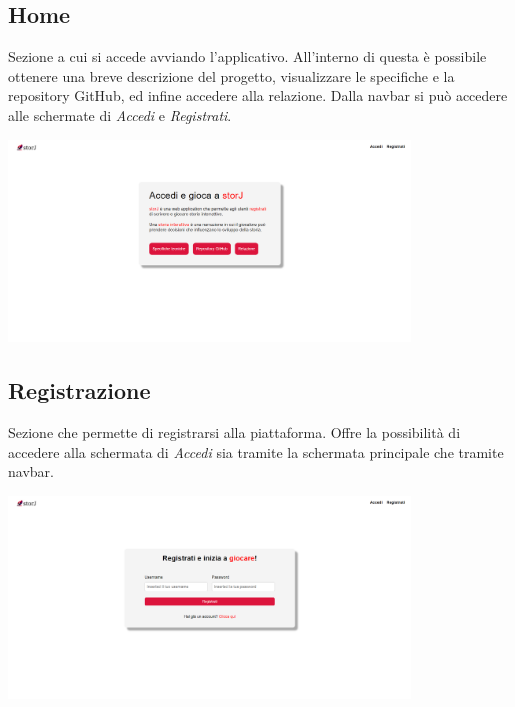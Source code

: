 \documentclass{article}
\begin{document}
\subsection*{Home}
Sezione a cui si accede avviando l'applicativo. All'interno di questa è possibile ottenere una breve descrizione del progetto, visualizzare le specifiche e la repository GitHub, ed infine accedere alla relazione. Dalla navbar si può accedere alle schermate di \textit{Accedi} e \textit{Registrati}.
\begin{center}
    \includegraphics[width=0.8\textwidth]{foto4.png}
\end{center}

\subsection*{Registrazione}
Sezione che permette di registrarsi alla piattaforma. Offre la possibilità di accedere alla schermata di \textit{Accedi} sia tramite la schermata principale che tramite navbar.
\begin{center}
    \includegraphics[width=0.8\textwidth]{foto5.png}
\end{center}
\end{document}
